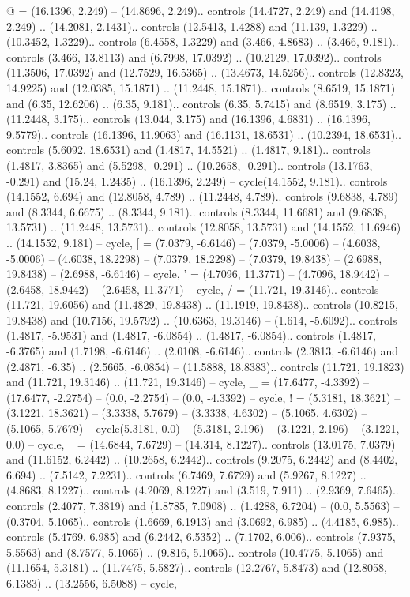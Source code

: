 {@} = {(16.1396, 2.249) -- (14.8696, 2.249).. controls (14.4727, 2.249) and (14.4198, 2.249) .. (14.2081, 2.1431).. controls (12.5413, 1.4288) and (11.139, 1.3229) .. (10.3452, 1.3229).. controls (6.4558, 1.3229) and (3.466, 4.8683) .. (3.466, 9.181).. controls (3.466, 13.8113) and (6.7998, 17.0392) .. (10.2129, 17.0392).. controls (11.3506, 17.0392) and (12.7529, 16.5365) .. (13.4673, 14.5256).. controls (12.8323, 14.9225) and (12.0385, 15.1871) .. (11.2448, 15.1871).. controls (8.6519, 15.1871) and (6.35, 12.6206) .. (6.35, 9.181).. controls (6.35, 5.7415) and (8.6519, 3.175) .. (11.2448, 3.175).. controls (13.044, 3.175) and (16.1396, 4.6831) .. (16.1396, 9.5779).. controls (16.1396, 11.9063) and (16.1131, 18.6531) .. (10.2394, 18.6531).. controls (5.6092, 18.6531) and (1.4817, 14.5521) .. (1.4817, 9.181).. controls (1.4817, 3.8365) and (5.5298, -0.291) .. (10.2658, -0.291).. controls (13.1763, -0.291) and (15.24, 1.2435) .. (16.1396, 2.249) -- cycle(14.1552, 9.181).. controls (14.1552, 6.694) and (12.8058, 4.789) .. (11.2448, 4.789).. controls (9.6838, 4.789) and (8.3344, 6.6675) .. (8.3344, 9.181).. controls (8.3344, 11.6681) and (9.6838, 13.5731) .. (11.2448, 13.5731).. controls (12.8058, 13.5731) and (14.1552, 11.6946) .. (14.1552, 9.181) -- cycle},
{[} = {(7.0379, -6.6146) -- (7.0379, -5.0006) -- (4.6038, -5.0006) -- (4.6038, 18.2298) -- (7.0379, 18.2298) -- (7.0379, 19.8438) -- (2.6988, 19.8438) -- (2.6988, -6.6146) -- cycle},
{'} = {(4.7096, 11.3771) -- (4.7096, 18.9442) -- (2.6458, 18.9442) -- (2.6458, 11.3771) -- cycle},
{/} = {(11.721, 19.3146).. controls (11.721, 19.6056) and (11.4829, 19.8438) .. (11.1919, 19.8438).. controls (10.8215, 19.8438) and (10.7156, 19.5792) .. (10.6363, 19.3146) -- (1.614, -5.6092).. controls (1.4817, -5.9531) and (1.4817, -6.0854) .. (1.4817, -6.0854).. controls (1.4817, -6.3765) and (1.7198, -6.6146) .. (2.0108, -6.6146).. controls (2.3813, -6.6146) and (2.4871, -6.35) .. (2.5665, -6.0854) -- (11.5888, 18.8383).. controls (11.721, 19.1823) and (11.721, 19.3146) .. (11.721, 19.3146) -- cycle},
{_} = {(17.6477, -4.3392) -- (17.6477, -2.2754) -- (0.0, -2.2754) -- (0.0, -4.3392) -- cycle},
{!} = {(5.3181, 18.3621) -- (3.1221, 18.3621) -- (3.3338, 5.7679) -- (3.3338, 4.6302) -- (5.1065, 4.6302) -- (5.1065, 5.7679) -- cycle(5.3181, 0.0) -- (5.3181, 2.196) -- (3.1221, 2.196) -- (3.1221, 0.0) -- cycle},
{~} = {(14.6844, 7.6729) -- (14.314, 8.1227).. controls (13.0175, 7.0379) and (11.6152, 6.2442) .. (10.2658, 6.2442).. controls (9.2075, 6.2442) and (8.4402, 6.694) .. (7.5142, 7.2231).. controls (6.7469, 7.6729) and (5.9267, 8.1227) .. (4.8683, 8.1227).. controls (4.2069, 8.1227) and (3.519, 7.911) .. (2.9369, 7.6465).. controls (2.4077, 7.3819) and (1.8785, 7.0908) .. (1.4288, 6.7204) -- (0.0, 5.5563) -- (0.3704, 5.1065).. controls (1.6669, 6.1913) and (3.0692, 6.985) .. (4.4185, 6.985).. controls (5.4769, 6.985) and (6.2442, 6.5352) .. (7.1702, 6.006).. controls (7.9375, 5.5563) and (8.7577, 5.1065) .. (9.816, 5.1065).. controls (10.4775, 5.1065) and (11.1654, 5.3181) .. (11.7475, 5.5827).. controls (12.2767, 5.8473) and (12.8058, 6.1383) .. (13.2556, 6.5088) -- cycle},
